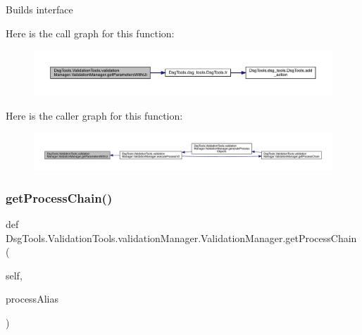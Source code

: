 \begin{DoxyVerb}Builds interface
\end{DoxyVerb}
 Here is the call graph for this function\+:
\nopagebreak
\begin{figure}[H]
\begin{center}
\leavevmode
\includegraphics[width=350pt]{class_dsg_tools_1_1_validation_tools_1_1validation_manager_1_1_validation_manager_aaba55832ad4846f8009124924c5b3cca_cgraph}
\end{center}
\end{figure}
Here is the caller graph for this function\+:
\nopagebreak
\begin{figure}[H]
\begin{center}
\leavevmode
\includegraphics[width=350pt]{class_dsg_tools_1_1_validation_tools_1_1validation_manager_1_1_validation_manager_aaba55832ad4846f8009124924c5b3cca_icgraph}
\end{center}
\end{figure}
\mbox{\label{class_dsg_tools_1_1_validation_tools_1_1validation_manager_1_1_validation_manager_a533bfcc682ca85c822147162426db5bd}} 
\subsubsection{\texorpdfstring{get\+Process\+Chain()}{getProcessChain()}}
{\footnotesize\ttfamily def Dsg\+Tools.\+Validation\+Tools.\+validation\+Manager.\+Validation\+Manager.\+get\+Process\+Chain (\begin{DoxyParamCaption}\item[{}]{self,  }\item[{}]{process\+Alias }\end{DoxyParamCaption})}

